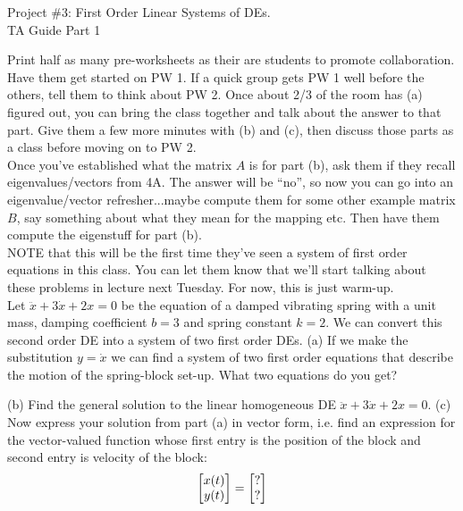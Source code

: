 \documentclass[epsf]{article}
\begin{document}
\newcommand{\R}{\mathbb{R}}
\newcommand{\noi}{\noindent}
\newcommand{\bs}{\bigskip}



\begin{center}
{\Large Project \#3: First Order Linear Systems of DEs.\\
\vskip 2mm
TA Guide Part 1}
\end{center}

\noi{\bf 1.} Print half as many pre-worksheets as their are students to promote collaboration.  Have them get started on PW 1.  If a quick group gets PW 1 well before the others, tell them to think about PW 2.  Once about 2/3 of the room has (a) figured out, you can bring the class together and talk about the answer to that part.  Give them a few more minutes with (b) and (c), then discuss those parts as a class before moving on to PW 2.\\

\noi{\bf 2. } Once you've established what the matrix $A$ is for part (b), ask them if they recall eigenvalues/vectors from 4A.  The answer will be ``no'', so now you can go into an eigenvalue/vector refresher...maybe compute them for some other example matrix $B$, say something about what they mean for the mapping etc.  Then have them compute the eigenstuff for part (b).\\

\noi{\bf 3. } NOTE that this will be the first time they've seen a system of first order equations in this class.  You can let them know that we'll start talking about these problems in lecture next Tuesday.  For now, this is just warm-up.\\

\noi{\bf PW 1}  Let $\ddot{x} + 3\dot{x} + 2x = 0$ be the equation of a damped vibrating spring with a unit mass, damping coefficient $b=3$ and spring constant $k=2$.  We can convert this second order DE into a system of two first order DEs.  
\vskip 2mm
\noi (a) If we make the substitution $y=\dot{x}$ we can find a system of two first order equations that describe the motion of the spring-block set-up.  What two equations do you get?  
\vskip 2mm

\noi (b) Find the general solution to the linear homogeneous DE $\ddot{x} + 3\dot{x} + 2x = 0$.
\vskip 2mm
\noi (c) Now express your solution from part (a) in vector form, i.e. find an expression for the vector-valued function whose first entry is the position of the block and second entry is velocity of the block:
$$\begin{bmatrix}x(t) \cr y(t) \end{bmatrix} = \begin{bmatrix} ? \cr ? \end{bmatrix}$$\\
\end{document}
